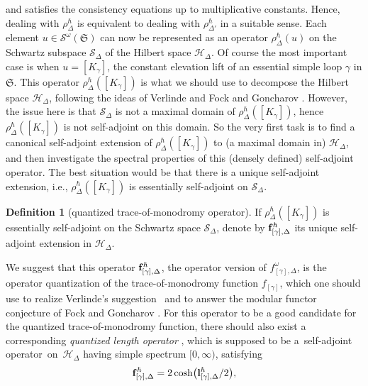 \documentclass[pdftex]{sigma}
\numberwithin{equation}{section}
\theoremstyle{definition}
\newtheorem{Definition}[Theorem]{Definition}
\begin{document}
and satisfies the consistency equations  up to multiplicative constants. Hence, dealing with $\rho^\hbar_\Delta$ is equivalent to dealing with $\rho^\hbar_{\Delta'}$ in a suitable sense.
Each element $u \in \mathcal{S}^\omega(\mathfrak{S})$ can now be represented as an operator $\rho^\hbar_\Delta(u)$ on the Schwartz subspace $\mathscr{S}_\Delta$ of the Hilbert space $\mathscr{H}_\Delta$. Of course the most important case is when $u = [K_\gamma]$, the constant elevation lift of an essential simple loop $\gamma$ in $\mathfrak{S}$. This operator $\rho^\hbar_\Delta([K_\gamma])$ is what we should use to decompose the Hilbert space $\mathscr{H}_\Delta$, following the ideas of Verlinde \cite{Verlinde} and Fock and Goncharov \cite{FG09}. However, the issue here is that $\mathscr{S}_\Delta$ is not a maximal domain of $\rho^\hbar_\Delta([K_\gamma])$, hence $\rho^\hbar_\Delta([K_\gamma])$ is not self-adjoint on this domain. So the very first task is to find a canonical self-adjoint extension of $\rho^\hbar_\Delta([K_\gamma])$ to (a maximal domain in) $\mathscr{H}_\Delta$, and then investigate the spectral properties of this (densely defined) self-adjoint operator. The best situation would be that there is a unique self-adjoint extension, i.e., $\rho^\hbar_\Delta([K_\gamma])$ is essentially self-adjoint on $\mathscr{S}_\Delta$.
\begin{Definition}[quantized trace-of-monodromy operator]
If $\rho^\hbar_\Delta([K_\gamma])$ is essentially self\nobreakdash-ad\-joint on the Schwartz space $\mathscr{S}_\Delta$, denote by ${\bf f}^\hbar_{[\gamma],\Delta}$ its unique self-adjoint extension in $\mathscr{H}_\Delta$.
\end{Definition}
We suggest that this operator ${\bf f}^\hbar_{[\gamma],\Delta}$, the operator version of $f^\omega_{[\gamma],\Delta}$, is the operator quantization of the trace-of-monodromy function $f_{[\gamma]}$, which one should use to realize Verlinde's suggestion~\cite{Verlinde} and to answer the modular functor conjecture of Fock and Goncharov \cite{FG09, F97}. For this operator to be a good candidate for the quantized trace-of-monodromy function, there should also exist a corresponding {\em quantized length operator} , which is supposed to be a~self-adjoint opera\-tor~on~$\mathscr{H}_\Delta$ having simple spectrum $[0,\infty)$, satisfying
\begin{align}
\label{eq:l_hbar_operator_definition}
{\bf f}^\hbar_{[\gamma],\Delta} = 2\cosh \bigl({\bf l}^\hbar_{[\gamma],\Delta}/2\bigr),
\end{align}
\end{document}
